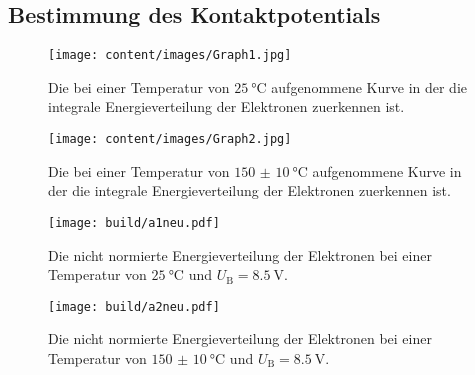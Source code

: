 \subsection{Bestimmung des Kontaktpotentials}
\begin{figure}
	\centering
	\caption{Die bei einer Temperatur von $\SI{25}{\degreeCelsius}$ aufgenommene Kurve in der die integrale Energieverteilung der Elektronen zuerkennen ist.}
	\texttt{[image: content/images/Graph1.jpg]}
	\label{fig:a1}
\end{figure}
\begin{figure}
	\centering
	\caption{Die bei einer Temperatur von $\SI{150(10)}{\degreeCelsius}$ aufgenommene Kurve in der die integrale Energieverteilung der Elektronen zuerkennen ist.}
	\texttt{[image: content/images/Graph2.jpg]}
	\label{fig:a2}
\end{figure}
\begin{figure}
	\centering
	\caption{Die nicht normierte Energieverteilung der Elektronen bei einer Temperatur von $\SI{25}{\degreeCelsius}$ und $U_\text{B}=\SI{8.5}{\volt}$.}
	\texttt{[image: build/a1neu.pdf]}
	\label{fig:a1A}
\end{figure}
\begin{figure}
	\centering
	\caption{Die nicht normierte Energieverteilung der Elektronen bei einer Temperatur von $\SI{150(10)}{\degreeCelsius}$ und $U_\text{B}=\SI{8.5}{\volt}$.}
	\texttt{[image: build/a2neu.pdf]}
	\label{fig:a2A}
\end{figure}
\begin{center}
	\begin{table}
		\begin{minipage}[t]{0.5\textwidth}
			\setcapwidth[c]{\textwidth}%
			\caption{Das bei den verschieden Gegenspannungen $U_\text{A}$ gemessene Gefälle $\overline{I}$ des Graphen in Abbildung \ref{fig:a1}.}
			\centering
			
		\end{minipage}
		\begin{minipage}[t]{0.5\textwidth}
			\setcapwidth[c]{\textwidth}%
			\caption{Das bei den verschieden Gegenspannungen $U_\text{A}$ gemessene Gefälle $\overline{I}$ des Graphen in Abbildung \ref{fig:a2}.}
			\centering
			
		\end{minipage}
	\end{table}
\end{center}
